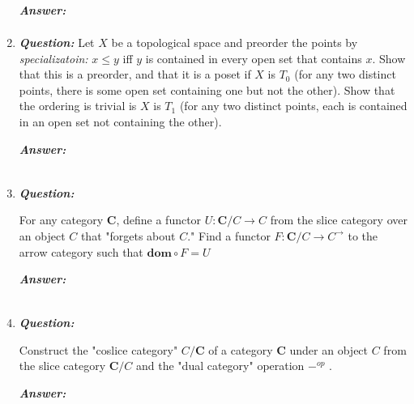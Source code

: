 \documentclass{article}
\begin{document}
\begin{enumerate}
\begin{enumerate}
	      \end{enumerate}
	      \textbf{\textit{Answer:}}
	      \begin{align*}
	      \end{align*}

	\item
	      \textbf{\textit{Question:}}
	      Let $X$ be a topological space and preorder the points by \textit{specializatoin:} $x \leq y$ iff $y$ is contained in every open set that contains $x$. Show that this is a preorder, and that it is a poset if $X$ is $T_0$ (for any two distinct points, there is some open set containing one but not the other). Show that the ordering is trivial is $X$ is $T_1$ (for any two distinct points, each is contained in an open set not containing the other).

	      \textbf{\textit{Answer:}}

	      \begin{align*}
	      \end{align*}



	\item
	      \textbf{\textit{Question:}}

	      For any category \textbf{C}, define a functor $ U : \textbf{C} / C \to C $ from the slice category over an object $ C $ that "forgets about $ C $."  Find a functor $ F : \textbf{C} / C \to C^{\to}$  to the arrow category such that $ \textbf{dom} \circ F = U $

	      \textbf{\textit{Answer:}}

	      \begin{align*}
	      \end{align*}



	\item
	      \textbf{\textit{Question:}}

	      Construct the "coslice category" $ C / \textbf{C}  $ of a category \textbf{C} under an object $ C $ from the slice category $ \textbf{C} / C $ and the "dual category" operation $ -^{op} $ .

	      \textbf{\textit{Answer:}}

	      \begin{align*}
	      \end{align*}




\end{enumerate}
\end{document}
